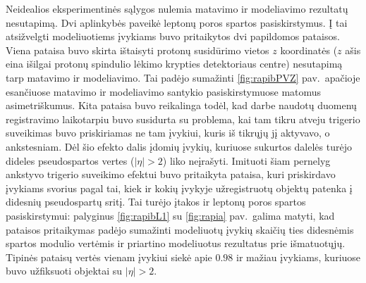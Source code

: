 \documentclass[a4paper, 12pt, twoside]{article}
\begin{document}
Neidealios eksperimentinės sąlygos nulemia matavimo ir modeliavimo rezultatų nesutapimą.
Dvi aplinkybės paveikė leptonų poros spartos pasiskirstymus.
Į tai atsižvelgti modeliuotiems įvykiams buvo pritaikytos dvi papildomos pataisos.
Viena pataisa buvo skirta ištaisyti protonų susidūrimo vietos $z$ koordinatės ($z$ ašis eina išilgai protonų
spindulio lėkimo krypties detektoriaus centre) nesutapimą tarp matavimo ir modeliavimo.
Tai padėjo sumažinti \ref{fig:rapibPVZ} pav.\ apačioje esančiuose matavimo ir modeliavimo santykio pasiskirstymuose
matomus asimetriškumus.
Kita pataisa buvo reikalinga todėl, kad darbe naudotų duomenų registravimo laikotarpiu buvo susidurta su problema,
kai tam tikru atveju trigerio suveikimas buvo priskiriamas ne tam įvykiui, kuris iš tikrųjų jį aktyvavo, o
ankstesniam.
Dėl šio efekto dalis įdomių įvykių, kuriuose sukurtos dalelės turėjo dideles pseudospartos vertes ($|\eta|>2$)
liko neįrašyti.
Imituoti šiam pernelyg ankstyvo trigerio suveikimo efektui buvo pritaikyta pataisa, kuri priskirdavo įvykiams
svorius pagal tai, kiek ir kokių įvykyje užregistruotų objektų patenka į didesnių pseudospartų sritį.
Tai turėjo įtakos ir leptonų poros spartos pasiskirstymui: palyginus \ref{fig:rapibL1} su \ref{fig:rapia} pav.\
galima matyti, kad pataisos pritaikymas padėjo sumažinti modeliuotų įvykių skaičių ties didesnėmis spartos modulio
vertėmis ir priartino modeliuotus rezultatus prie išmatuotųjų.
Tipinės pataisų vertės vienam įvykiui siekė apie $0.98$ ir mažiau įvykiams, kuriuose buvo užfiksuoti objektai su
$|\eta|>2$.
\end{document}
